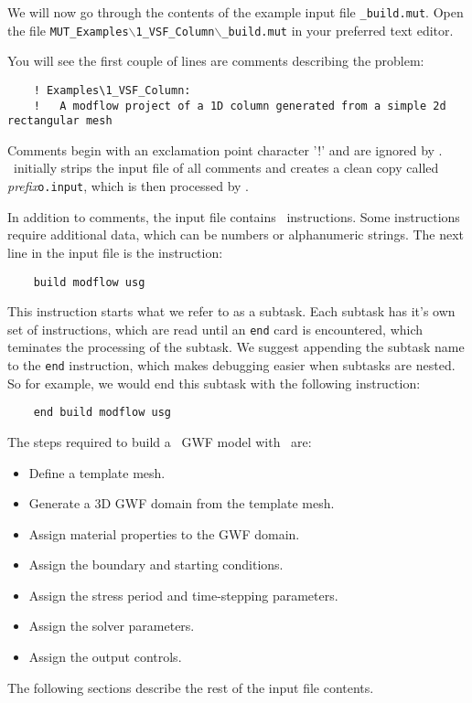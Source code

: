 We will now go through the contents of the example input file \texttt{\_build.mut}. Open the file \texttt{MUT\_Examples$\backslash$1\_VSF\_Column$\backslash$\_build.mut} in your preferred text editor.

You will see the first couple of lines are comments describing the problem:
\begin{verbatim}
    ! Examples\1_VSF_Column:
    !   A modflow project of a 1D column generated from a simple 2d rectangular mesh
\end{verbatim}
Comments begin with an exclamation point character '!' and are ignored by \mut.  \mut\ initially strips the input file of all comments and creates a clean copy called \textit{prefix}\verb+o.input+, which is then processed by \mut.

In addition to comments, the input file contains \mut\ instructions.  Some instructions require additional data, which can be numbers or alphanumeric strings.
The next line in the input file is the instruction:
\begin{verbatim}
    build modflow usg
\end{verbatim}
This instruction starts what we refer to as a subtask.  Each subtask has it's own set of instructions, which are read until an \texttt{end} card is encountered, which teminates the processing of the subtask.  We suggest appending the subtask name to the \texttt{end} instruction, which makes debugging easier when subtasks are nested.  So for example, we would end this subtask with the following instruction:
\begin{verbatim}
    end build modflow usg
\end{verbatim}


The steps required to build a \mfus\ GWF model with \mut\ are:
\begin{itemize}
    \item Define a template mesh.
    \item Generate a 3D GWF domain from the template mesh.
    \item Assign material properties to the GWF domain.
    \item Assign the boundary and starting conditions.
    \item Assign the stress period and time-stepping parameters.
    \item Assign the solver parameters.
    \item Assign the output controls.
\end{itemize}

The following sections describe the rest of the input file contents.

